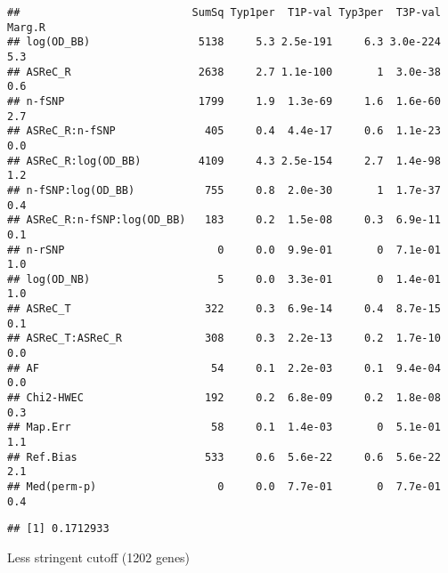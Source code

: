 \documentclass[]{article}
\newenvironment{Shaded}{\begin{snugshade}}{\end{snugshade}}
\newcommand{\KeywordTok}[1]{\textcolor[rgb]{0.13,0.29,0.53}{\textbf{#1}}}
\newcommand{\DataTypeTok}[1]{\textcolor[rgb]{0.13,0.29,0.53}{#1}}
\newcommand{\StringTok}[1]{\textcolor[rgb]{0.31,0.60,0.02}{#1}}
\newcommand{\OperatorTok}[1]{\textcolor[rgb]{0.81,0.36,0.00}{\textbf{#1}}}
\newcommand{\NormalTok}[1]{#1}
\begin{document}
\begin{verbatim}
##                           SumSq Typ1per  T1P-val Typ3per  T3P-val Marg.R
## log(OD_BB)                 5138     5.3 2.5e-191     6.3 3.0e-224    5.3
## ASReC_R                    2638     2.7 1.1e-100       1  3.0e-38    0.6
## n-fSNP                     1799     1.9  1.3e-69     1.6  1.6e-60    2.7
## ASReC_R:n-fSNP              405     0.4  4.4e-17     0.6  1.1e-23    0.0
## ASReC_R:log(OD_BB)         4109     4.3 2.5e-154     2.7  1.4e-98    1.2
## n-fSNP:log(OD_BB)           755     0.8  2.0e-30       1  1.7e-37    0.4
## ASReC_R:n-fSNP:log(OD_BB)   183     0.2  1.5e-08     0.3  6.9e-11    0.1
## n-rSNP                        0     0.0  9.9e-01       0  7.1e-01    1.0
## log(OD_NB)                    5     0.0  3.3e-01       0  1.4e-01    1.0
## ASReC_T                     322     0.3  6.9e-14     0.4  8.7e-15    0.1
## ASReC_T:ASReC_R             308     0.3  2.2e-13     0.2  1.7e-10    0.0
## AF                           54     0.1  2.2e-03     0.1  9.4e-04    0.0
## Chi2-HWEC                   192     0.2  6.8e-09     0.2  1.8e-08    0.3
## Map.Err                      58     0.1  1.4e-03       0  5.1e-01    1.1
## Ref.Bias                    533     0.6  5.6e-22     0.6  5.6e-22    2.1
## Med(perm-p)                   0     0.0  7.7e-01       0  7.7e-01    0.4
\end{verbatim}

\begin{Shaded}
\end{Shaded}

\begin{verbatim}
## [1] 0.1712933
\end{verbatim}

\begin{Shaded}
\end{Shaded}

Less stringent cutoff (1202 genes)
\end{document}

